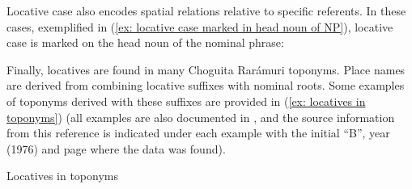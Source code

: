 \z

Locative case also encodes spatial relations relative to specific referents. In these cases, exemplified in (\ref{ex: locative case marked in head noun of NP}), locative case is marked on the head noun of the nominal phrase:

\ea\label{ex: locative case marked in head noun of NP}

    \z
\z

\hspace*{-2pt}Finally, locatives are found in many Choguita Rarámuri toponyms. Place names are derived from combining locative suffixes with nominal roots. Some examples of toponyms derived with these suffixes are provided in (\ref{ex: locatives in toponyms}) (all examples are also documented in \citet{brambila1976diccionario}, and the source information from this reference is indicated under each example with the initial ``B'', year (1976) and page where the data was found).

\pagebreak

\ea\label{ex: locatives in toponyms}
{Locatives in toponyms}\\

